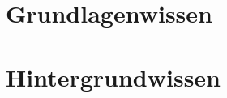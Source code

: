 \documentclass[
    load-dhbw-templates,                  %
    auto-intro-pages = custom,                     %
    add-tocs-to-toc,                      %
    mainlanguage = ngerman,               %
    debug                                 %
]{iodhbwm}
\begin{document}
    

    \part{Grundlagenwissen}
    \Blinddocument
    
    \part{Hintergrundwissen}
    \Blinddocument
\end{document}
